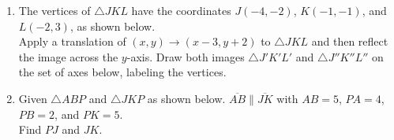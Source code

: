 \documentclass[12pt, twoside]{article}
\begin{document}
\begin{enumerate}
    \item The vertices of $\triangle JKL$ have the coordinates $J(-4,-2)$, $K(-1,-1)$, and $L(-2,3)$, as shown below. \\[0.5cm]
    Apply a translation of $(x,y) \rightarrow (x-3, y+2)$ to $\triangle JKL$ and then reflect the image across the $y$-axis. Draw both images $\triangle J'K'L'$ and $\triangle J''K''L''$ on the set of axes below, labeling the vertices.  \vspace{3cm}
    \begin{center}
    \end{center}



\newpage


\item Given $\triangle ABP$ and $\triangle JKP$ as shown below. $\overline{AB} \parallel \overline{JK}$ with $AB=5$, $PA=4$, $PB=2$, and $PK=5$.\\[0.25cm]
Find $PJ$ and $JK$.\\[0.5cm]
    \vspace{3cm}



\end{enumerate}
\end{document}
